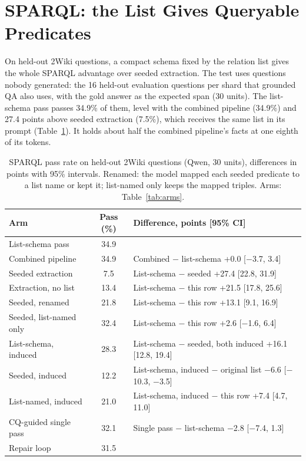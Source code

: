 


\section{SPARQL: the List Gives Queryable Predicates}
\label{sec:res-cqs}

On held-out 2Wiki questions, a compact schema fixed by the relation list gives the whole SPARQL advantage over seeded extraction. The test uses questions nobody generated: the 16 held-out evaluation questions per shard that grounded QA also uses, with the gold answer as the expected span (30 units). The list-schema pass passes 34.9\% of them, level with the combined pipeline (34.9\%) and 27.4 points above seeded extraction (7.5\%), which receives the same list in its prompt (Table~\ref{tab:sparql}). It holds about half the combined pipeline's facts at one eighth of its tokens.

\begin{table}[t]
\centering
\caption{SPARQL pass rate on held-out 2Wiki questions (Qwen, 30 units), differences in points with 95\% intervals. Renamed: the model mapped each seeded predicate to a list name or kept it; list-named only keeps the mapped triples. Arms: Table~\ref{tab:arms}.}
\label{tab:sparql}
\footnotesize\setlength{\tabcolsep}{3pt}
\begin{tabular}{@{}p{2.45cm}c>{\raggedright\arraybackslash}p{4.75cm}@{}}
\toprule
Arm & Pass (\%) & Difference, points [95\% CI] \\
\midrule
List-schema pass & 34.9 & \\
Combined pipeline & 34.9 & Combined $-$ list-schema +0.0 [$-$3.7, 3.4] \\
Seeded extraction & 7.5 & List-schema $-$ seeded +27.4 [22.8, 31.9] \\
Extraction, no list & 13.4 & List-schema $-$ this row +21.5 [17.8, 25.6] \\
Seeded, renamed & 21.8 & List-schema $-$ this row +13.1 [9.1, 16.9] \\
Seeded, list-named only & 32.4 & List-schema $-$ this row +2.6 [$-$1.6, 6.4] \\
List-schema, induced & 28.3 & List-schema $-$ seeded, both induced +16.1 [12.8, 19.4] \\
Seeded, induced & 12.2 & List-schema, induced $-$ original list $-$6.6 [$-$10.3, $-$3.5] \\
List-named, induced & 21.0 & List-schema, induced $-$ this row +7.4 [4.7, 11.0] \\
CQ-guided single pass & 32.1 & Single pass $-$ list-schema $-$2.8 [$-$7.4, 1.3] \\
Repair loop & 31.5 & \\
\bottomrule
\end{tabular}
\end{table}

